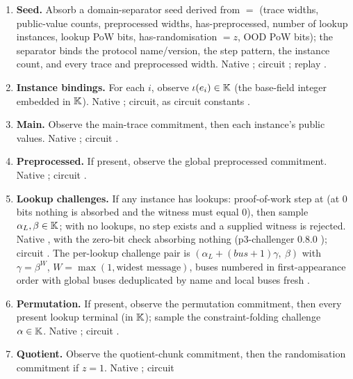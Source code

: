 \begin{enumerate}
\item[T0.] \textbf{Seed.} Absorb a domain-separator seed derived from
   $=$ (trace widths, public-value counts, preprocessed widths,
  has-preprocessed, number of lookup instances, lookup PoW bits,
  has-randomisation $=z$, OOD PoW bits); the separator binds the protocol
  name/version, the step pattern, the instance count, and every trace and
  preprocessed width. Native ; circuit
  ; replay .
\item[T1.] \textbf{Instance bindings.} For each $i$, observe
  $\iota(e_i) \in \mathbb{K}$ (the base-field integer embedded in $\mathbb{K}$). Native
  ; circuit, as circuit constants
  .
\item[T2.] \textbf{Main.} Observe the main-trace commitment, then each instance's
  public values. Native ; circuit
  .
\item[T3.] \textbf{Preprocessed.} If present, observe the global preprocessed
  commitment. Native ; circuit
  .
\item[T4.] \textbf{Lookup challenges.} If any instance has lookups:
  proof-of-work step at  (at $0$ bits nothing is absorbed
  and the witness must equal $0$), then sample $\alpha_L, \beta \in \mathbb{K}$; with no
  lookups, no step exists and a supplied witness is rejected. Native
  , with the zero-bit check absorbing nothing
  (p3-challenger 0.8.0 ); circuit
  .
  The per-lookup challenge pair is $(\alpha_L + (\mathit{bus}+1)\gamma,\ \beta)$
  with $\gamma = \beta^{W}$, $W = \max(1, \text{widest message})$, buses numbered
  in first-appearance order with global buses deduplicated by name and local
  buses fresh .
\item[T5.] \textbf{Permutation.} If present, observe the permutation commitment,
  then every present lookup terminal (in $\mathbb{K}$); sample the constraint-folding
  challenge $\alpha \in \mathbb{K}$. Native ; circuit
  .
\item[T6.] \textbf{Quotient.} Observe the quotient-chunk commitment, then the
  randomisation commitment if $z=1$. Native ; circuit

\end{enumerate}
